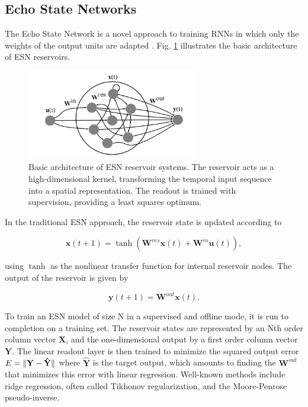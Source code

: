 \subsection{Echo State Networks}

The Echo State Network is a novel approach to training RNNs in which only the
weights of the output units are adapted \cite{jaeger_echo_2001}. Fig. \ref{esn}
illustrates the basic architecture of ESN reservoirs.

\begin{figure}[H]
  \centering
  \includegraphics[width=3.0in]{img/esn.png}
  \caption{
    Basic architecture of ESN reservoir systems. The reservoir acts as a
high-dimensional kernel, transforming the temporal input sequence into a spatial
representation. The readout is trained with supervision, providing a least
squares optimum.
  }
  \label{esn}
\end{figure}

In the traditional ESN approach, the reservoir state is updated according to

\begin{equation}
  \mathbf{x}(t + 1) =
    \tanh(\mathbf{W}^{res}\mathbf{x}(t)
        + \mathbf{W}^{in}\mathbf{u}(t)),
  \label{xt}
\end{equation}

\noindent using $\tanh$ as the nonlinear transfer function for internal
reservoir nodes. The output of the reservoir is given by

\begin{equation}
  \mathbf{y}(t + 1) =
    \mathbf{W}^{out}\mathbf{x}(t).
  \label{yt}
\end{equation}

To train an ESN model of size N in a supervised and offline mode, it is run to
completion on a training set. The reservoir states are represented by an Nth
order column vector $\mathbf{X}$, and the one-dimensional output by a first
order column vector $\mathbf{Y}$. The linear readout layer is then trained to
minimize the squared output error $E = \Vert \mathbf{Y} - \mathbf{\hat{Y}} \Vert$
where $\mathbf{\hat{Y}}$ is the target output, which amounts to finding the
$\mathbf{W}^{out}$ that minimizes this error with linear regression. Well-known
methods include ridge regression, often called Tikhonov regularization, and the
Moore-Penrose pseudo-inverse.

